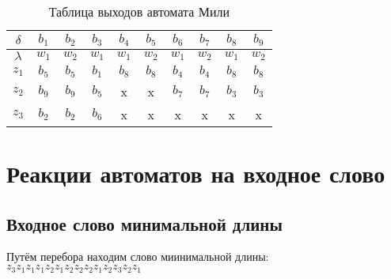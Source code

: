 \documentclass[a4paper,10pt]{article}
\begin{document}
        \begin{table}[!h]
            \begin{tabular} {|c|c|c|c|c|c|c|c|c|c|}
                \hline
                $\delta$  & $b_1$ & $b_2$ & $b_3$ & $b_4$ & $b_5$ & $b_6$ & $b_7$ & $b_8$ & $b_9$ \\ \hline
                $\lambda$ & $w_1$ & $w_2$ & $w_1$ & $w_1$ & $w_2$ & $w_1$ & $w_2$ & $w_1$ & $w_2$ \\ \hline
                $z_1$     & $b_5$ & $b_5$ & $b_1$ & $b_8$ & $b_8$ & $b_4$ & $b_4$ & $b_8$ & $b_8$ \\ \hline
                $z_2$     & $b_9$ & $b_9$ & $b_5$ & x     & x     & $b_7$ & $b_7$ & $b_3$ & $b_3$ \\ \hline
                $z_3$     & $b_2$ & $b_2$ & $b_6$ & x     & x     & x     & x     & x     & x     \\ \hline
            \end{tabular}
            \caption{Таблица выходов автомата Мили}
        \end{table}

\section*{Реакции автоматов на входное слово}
        \subsection*{Входное слово минимальной длины}
        Путём перебора находим слово миинимальной длины: \\
            $z_3 z_1 z_1 z_1 z_2 z_1 z_2 z_2 z_2 z_1 z_2 z_3 z_2 z_1$
\end{document}
